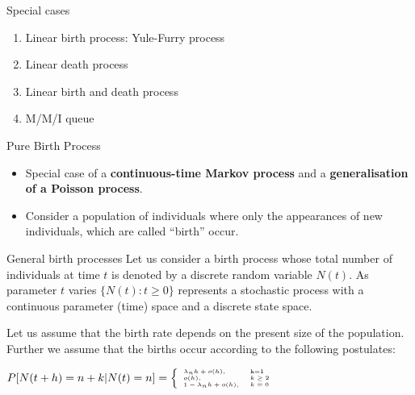 \documentclass[12pt,ignorenonframetext,]{beamer}
\begin{document}
\begin{frame}{Special cases}
\protect\hypertarget{special-cases}{}
\begin{enumerate}
\item
  Linear birth process: Yule-Furry process
\item
  Linear death process
\item
  Linear birth and death process
\item
  M/M/I queue
\end{enumerate}
\end{frame}

\begin{frame}{Pure Birth Process}
\protect\hypertarget{pure-birth-process}{}
\begin{itemize}
\item
  Special case of a \textbf{continuous-time Markov process} and a
  \textbf{generalisation of a Poisson process}.
\item
  Consider a population of individuals where only the appearances of new
  individuals, which are called ``birth'' occur.
\end{itemize}
\end{frame}

\begin{frame}{General birth processes}
\protect\hypertarget{general-birth-processes}{}
Let us consider a birth process whose total number of individuals at
time \(t\) is denoted by a discrete random variable \(N(t)\). As
parameter \(t\) varies \(\{ N(t): t\geq 0\}\) represents a stochastic
process with a continuous parameter (time) space and a discrete state
space.

Let us assume that the birth rate depends on the present size of the
population. Further we assume that the births occur according to the
following postulates:

\begin{math}
\tiny
 P[N(t+h) = n+k|N(t)=n]=\left\{
    \begin{array}{ll}
      \lambda_n h + o(h), & \mbox{k=1}\\
      o(h), & k \geq 2 \\
      1-\lambda_n h + o(h), & k = 0 \\
    \end{array}
  \right.
\end{math}
\end{frame}
\end{document}
